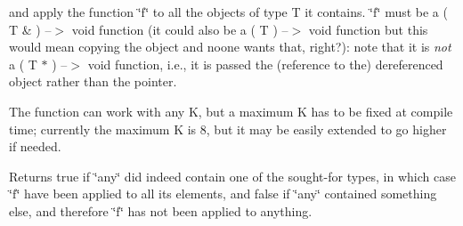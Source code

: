 and apply the function \char`\"{}f\char`\"{} to all the objects of type T it contains. \char`\"{}f\char`\"{} must be a ( T \& ) --$>$ void function (it could also be a ( T ) --$>$ void function but this would mean copying the object and noone wants that, right?)\+: note that it is {\itshape not} a ( T $\ast$ ) --$>$ void function, i.\+e., it is passed the (reference to the) dereferenced object rather than the pointer.

The function can work with any K, but a maximum K has to be fixed at compile time; currently the maximum K is 8, but it may be easily extended to go higher if needed.

Returns true if \char`\"{}any\char`\"{} did indeed contain one of the sought-\/for types, in which case \char`\"{}f\char`\"{} have been applied to all its elements, and false if \char`\"{}any\char`\"{} contained something else, and therefore \char`\"{}f\char`\"{} has not been applied to anything. 